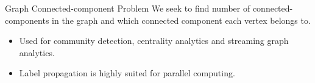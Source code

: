 

\begin{block}{Graph Connected-component Problem}
We seek to find number of connected-components in the graph and which connected component 
each vertex belongs to.
\begin{itemize}
\item Used for community detection, centrality analytics and streaming graph analytics. 
\item Label propagation is highly suited for parallel computing. 
\end{itemize}
\end{block}
\lyxframeend{}

